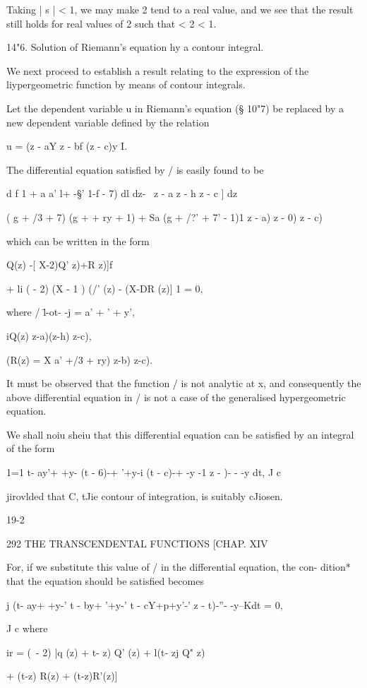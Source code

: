 Taking | s | < 1, we may make 2 tend to a real value, and we see that
the result still holds for real values of 2 such that < 2 < 1.

14"6. Solution of Riemann's equation hy a contour integral.

We next proceed to establish a result relating to the expression of
the liypergeometric function by means of contour integrals.

Let the dependent variable u in Riemann's equation (§ 10"7) be
replaced by a new dependent variable defined by the relation

u = (z - aY z - bf (z - c)y I.

The differential equation satisfied by / is easily found to be

d f 1 + a a' l+ -§' 1-f - 7) dl dz- \ z - a z - h z - c ] dz

( g + /3 + 7) (g + + ry + 1) + Sa (g + /?' + 7' - 1)1 z - a) z - 0) z
- c)

which can be written in the form

Q(z) -[ X-2)Q' z)+R z)]f

+ li ( - 2) (X - 1 ) (/' (z) - (X-DR (z)] 1 = 0,

where / \=l-ot- -j = a' + ' + y',

iQ(z) z-a)(z-h) z-c),

(R(z) = X a' +/3 + ry) z-b) z-c).

It must be observed that the function / is not analytic at x, and
consequently the above differential equation in / is not a case of the
generalised hypergeometric equation.

We shall noiu sheiu that this differential equation can be satisfied
by an integral of the form

1=1 t- ay'+ +y- (t - 6)-+ '+y-i (t - c)-+ -y -1 z - )- - -y dt, J c

jirovlded that C, tJie contour of integration, is suitably cJiosen.

19-2

292 THE TRANSCENDENTAL FUNCTIONS [CHAP. XIV

For, if we substitute this value of / in the differential equation,
the con- dition* that the equation should be satisfied becomes

j (t- ay+ +y-' t - by+ '+y-' t - cY+p+y'-' z - t)-''- -y--Kdt = 0,

J c where

ir = (\ - 2) |q (z) + t- z) Q' (z) + l(t- zj Q" z)

+ (t-z) R(z) + (t-z)R'(z)]

